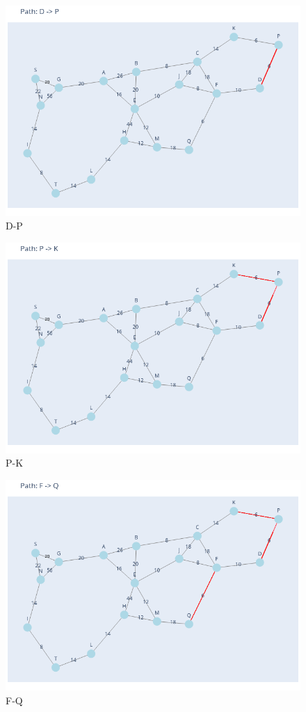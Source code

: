 \documentclass[11pt]{book}
\renewcommand{\=}[1]{\stackrel{#1}{=}} %
\theoremstyle{definition}
\theoremstyle{remark}
\begin{document}
\begin{figure}
    \centering
    \includegraphics[width=1\linewidth]{Trenches/1.png}
    \caption{D-P}
    \label{fig:enter-label}
\end{figure}
\begin{figure}
    \centering
    \includegraphics[width=1\linewidth]{Trenches/2.png}
    \caption{P-K}
    \label{fig:enter-label}
\end{figure}
\begin{figure}
    \centering
    \includegraphics[width=1\linewidth]{Trenches/3.png}
    \caption{F-Q}
    \label{fig:enter-label}
\end{figure}
\end{document}
